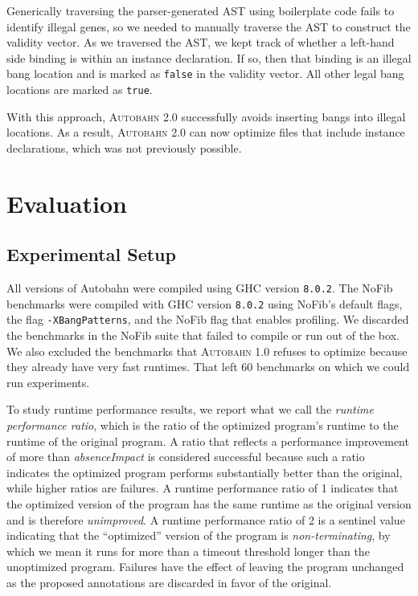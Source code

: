 \documentclass[format=sigplan, review=true]{acmart}
\newcommand{\Ao}[0]{\textsc{Autobahn 1.0}}
\newcommand{\At}[0]{\textsc{Autobahn 2.0}}
\newcommand{\absim}[0]{\textit{absenceImpact}}
\newcommand{\nonterm}[0]{non-terminating}
\newcommand{\unimp}[0]{unimproved}
\begin{document}
Generically traversing the parser-generated AST using boilerplate code
fails to identify illegal genes, so we needed to manually traverse the AST
to construct the validity vector. As we traversed the AST, we kept
track of whether a left-hand side binding is within an instance
declaration. If so, then that binding is an illegal bang location and
is marked as \texttt{false} in the validity vector. All other
legal bang locations are marked as  \texttt{true}.

With this approach, \At{} successfully avoids inserting bangs into
illegal locations.  As a result, \At{} can now optimize files that
include instance declarations, which was not previously possible.

\section{Evaluation}

\subsection{Experimental Setup}

All versions of Autobahn were compiled using GHC
version \texttt{8.0.2}. The NoFib benchmarks were compiled with
GHC version \texttt{8.0.2} using NoFib's default flags, the flag
\texttt{-XBangPatterns}, and the NoFib flag that enables profiling. 
We discarded the benchmarks in the NoFib suite that failed to compile
or run out of the box. We also excluded the benchmarks that \Ao{}
refuses to optimize because they already have very fast runtimes. That
left 60 benchmarks on which we could run experiments.

To study runtime performance results, we report what we call
the \textit{runtime performance ratio}, which is the ratio of the
optimized program's runtime to the runtime of the original program.
A ratio that reflects a performance improvement of more than \absim{}
is considered successful
because such a ratio indicates the
optimized program performs substantially better than the original, while higher
ratios are failures.  A runtime performance ratio of 1 indicates that
the optimized version of the program has the same runtime as the
original version and is therefore \textit{\unimp{}}.  A runtime
performance ratio of 2 is a sentinel value indicating that the
``optimized'' version of the program is \textit{\nonterm{}}, by which
we mean it runs for more than a timeout threshold longer than the
unoptimized program.  Failures have the effect of leaving the program
unchanged as the proposed annotations are discarded in favor of the
original.
\end{document}
